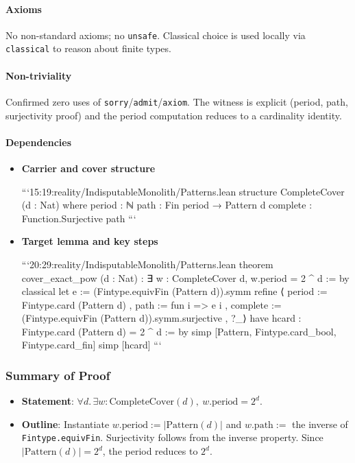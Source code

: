 \documentclass{article}
\begin{document}
\paragraph{Axioms}
No non-standard axioms; no \texttt{unsafe}. Classical choice is used locally via \texttt{classical} to reason about finite types.

\paragraph{Non-triviality}
Confirmed zero uses of \texttt{sorry}/\texttt{admit}/\texttt{axiom}. The witness is explicit (period, path, surjectivity proof) and the period computation reduces to a cardinality identity.

\paragraph{Dependencies}
\begin{itemize}[leftmargin=*]
  \item \textbf{Carrier and cover structure}

```15:19:reality/IndisputableMonolith/Patterns.lean
structure CompleteCover (d : Nat) where
  period : ℕ
  path   : Fin period → Pattern d
  complete : Function.Surjective path
```

  \item \textbf{Target lemma and key steps}

```20:29:reality/IndisputableMonolith/Patterns.lean
theorem cover_exact_pow (d : Nat) : ∃ w : CompleteCover d, w.period = 2 ^ d := by
  classical
  let e := (Fintype.equivFin (Pattern d)).symm
  refine ⟨{ period := Fintype.card (Pattern d)
          , path := fun i => e i
          , complete := (Fintype.equivFin (Pattern d)).symm.surjective }, ?_⟩
  have hcard : Fintype.card (Pattern d) = 2 ^ d := by
    simp [Pattern, Fintype.card_bool, Fintype.card_fin]
  simp [hcard]
```
\end{itemize}

\subsubsection{Summary of Proof}
\begin{itemize}[leftmargin=*]
  \item \textbf{Statement}: \(\forall d.\,\exists w:\mathrm{CompleteCover}(d),\ w.\mathrm{period}=2^d\).
  \item \textbf{Outline}: Instantiate \(w.\mathrm{period}:=|\mathrm{Pattern}(d)|\) and \(w.\mathrm{path}:=\) the inverse of \texttt{Fintype.equivFin}. Surjectivity follows from the inverse property. Since \(|\mathrm{Pattern}(d)|=2^d\), the period reduces to \(2^d\).
\end{itemize}
\end{document}

